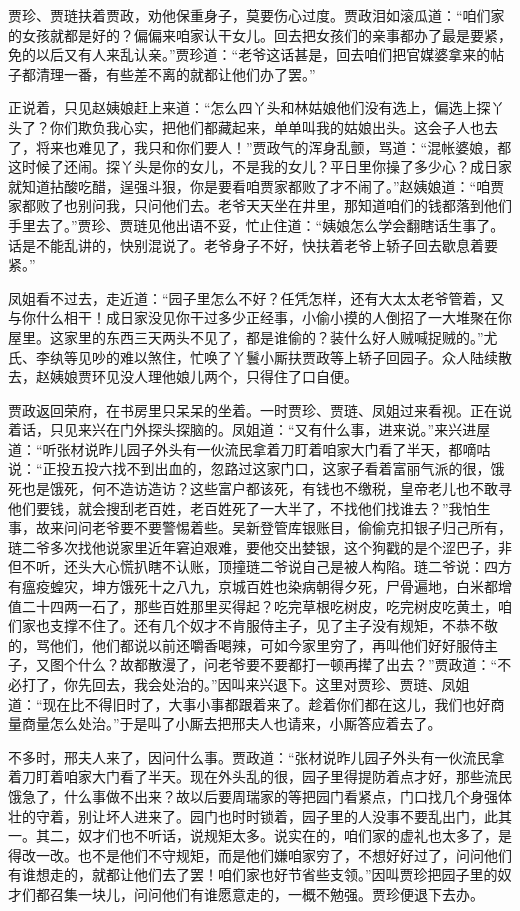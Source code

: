 \documentclass[12pt,oneside]{book}
\begin{document}
贾珍、贾琏扶着贾政，劝他保重身子，莫要伤心过度。贾政泪如滚瓜道：“咱们家的女孩就都是好的？偏偏来咱家认干女儿。回去把女孩们的亲事都办了最是要紧，免的以后又有人来乱认亲。”贾珍道：“老爷这话甚是，回去咱们把官媒婆拿来的帖子都清理一番，有些差不离的就都让他们办了罢。”

正说着，只见赵姨娘赶上来道：“怎么四丫头和林姑娘他们没有选上，偏选上探丫头了？你们欺负我心实，把他们都藏起来，单单叫我的姑娘出头。这会子人也去了，将来也难见了，我只和你们要人！”贾政气的浑身乱颤，骂道：“混帐婆娘，都这时候了还闹。探丫头是你的女儿，不是我的女儿？平日里你操了多少心？成日家就知道拈酸吃醋，逞强斗狠，你是要看咱贾家都败了才不闹了。”赵姨娘道：“咱贾家都败了也别问我，只问他们去。老爷天天坐在井里，那知道咱们的钱都落到他们手里去了。”贾珍、贾琏见他出语不妥，忙止住道：“姨娘怎么学会翻瞎话生事了。话是不能乱讲的，快别混说了。老爷身子不好，快扶着老爷上轿子回去歇息着要紧。”

凤姐看不过去，走近道：“园子里怎么不好？任凭怎样，还有大太太老爷管着，又与你什么相干！成日家没见你干过多少正经事，小偷小摸的人倒招了一大堆聚在你屋里。这家里的东西三天两头不见了，都是谁偷的？装什么好人贼喊捉贼的。”尤氏、李纨等见吵的难以煞住，忙唤了丫鬟小厮扶贾政等上轿子回园子。众人陆续散去，赵姨娘贾环见没人理他娘儿两个，只得住了口自便。

贾政返回荣府，在书房里只呆呆的坐着。一时贾珍、贾琏、凤姐过来看视。正在说着话，只见来兴在门外探头探脑的。凤姐道：“又有什么事，进来说。”来兴进屋道：“听张材说昨儿园子外头有一伙流民拿着刀盯着咱家大门看了半天，都嘀咕说：“正投五投六找不到出血的，忽路过这家门口，这家子看着富丽气派的很，饿死也是饿死，何不造访造访？这些富户都该死，有钱也不缴税，皇帝老儿也不敢寻他们要钱，就会搜刮老百姓，老百姓死了一大半了，不找他们找谁去？”我怕生事，故来问问老爷要不要警惕着些。吴新登管库银账目，偷偷克扣银子归己所有，琏二爷多次找他说家里近年窘迫艰难，要他交出婪银，这个狗戳的是个涩巴子，非但不听，还头大心慌扒瞎不认账，顶撞琏二爷说自己是被人构陷。琏二爷说：四方有瘟疫蝗灾，坤方饿死十之八九，京城百姓也染病朝得夕死，尸骨遍地，白米都增值二十四两一石了，那些百姓那里买得起？吃完草根吃树皮，吃完树皮吃黄土，咱们家也支撑不住了。还有几个奴才不肯服侍主子，见了主子没有规矩，不恭不敬的，骂他们，他们都说以前还嚼香喝辣，可如今家里穷了，再叫他们好好服侍主子，又图个什么？故都散漫了，问老爷要不要都打一顿再撵了出去？”贾政道：“不必打了，你先回去，我会处治的。”因叫来兴退下。这里对贾珍、贾琏、凤姐道：“现在比不得旧时了，大事小事都跟着来了。趁着你们都在这儿，我们也好商量商量怎么处治。”于是叫了小厮去把邢夫人也请来，小厮答应着去了。

不多时，邢夫人来了，因问什么事。贾政道：“张材说昨儿园子外头有一伙流民拿着刀盯着咱家大门看了半天。现在外头乱的很，园子里得提防着点才好，那些流民饿急了，什么事做不出来？故以后要周瑞家的等把园门看紧点，门口找几个身强体壮的守着，别让坏人进来了。园门也时时锁着，园子里的人没事不要乱出门，此其一。其二，奴才们也不听话，说规矩太多。说实在的，咱们家的虚礼也太多了，是得改一改。也不是他们不守规矩，而是他们嫌咱家穷了，不想好好过了，问问他们有谁想走的，就都让他们去了罢！咱们家也好节省些支领。”因叫贾珍把园子里的奴才们都召集一块儿，问问他们有谁愿意走的，一概不勉强。贾珍便退下去办。
\end{document}
